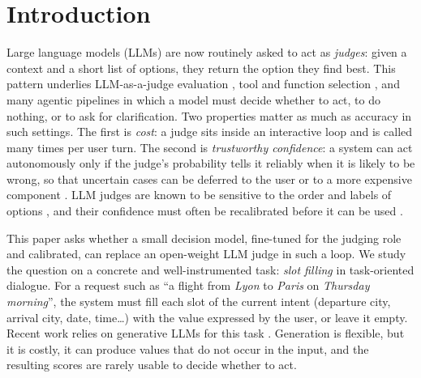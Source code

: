 \section{Introduction}
\label{sec:intro}

Large language models (LLMs) are now routinely asked to act as \emph{judges}: given a context and a short list of options, they return the option they find best. This pattern underlies LLM-as-a-judge evaluation \citep{zheng2023mtbench,liu2023geval}, tool and function selection \citep{li2024fnctod}, and many agentic pipelines in which a model must decide whether to act, to do nothing, or to ask for clarification. Two properties matter as much as accuracy in such settings. The first is \emph{cost}: a judge sits inside an interactive loop and is called many times per user turn. The second is \emph{trustworthy confidence}: a system can act autonomously only if the judge's probability tells it reliably when it is likely to be wrong, so that uncertain cases can be deferred to the user or to a more expensive component \citep{geifman2017selective}. LLM judges are known to be sensitive to the order and labels of options \citep{wang2024fair,li2025calibraeval}, and their confidence must often be recalibrated before it can be used \citep{radharapu2026calibrating}.

This paper asks whether a small decision model, fine-tuned for the judging role and calibrated, can replace an open-weight LLM judge in such a loop. We study the question on a concrete and well-instrumented task: \emph{slot filling} in task-oriented dialogue. For a request such as ``a flight from \emph{Lyon} to \emph{Paris} on \emph{Thursday morning}'', the system must fill each slot of the current intent (departure city, arrival city, date, time\ldots) with the value expressed by the user, or leave it empty. Recent work relies on generative LLMs for this task \citep{hu2022icdst,heck2023chatgpt,li2024fnctod}. Generation is flexible, but it is costly, it can produce values that do not occur in the input, and the resulting scores are rarely usable to decide whether to act.

